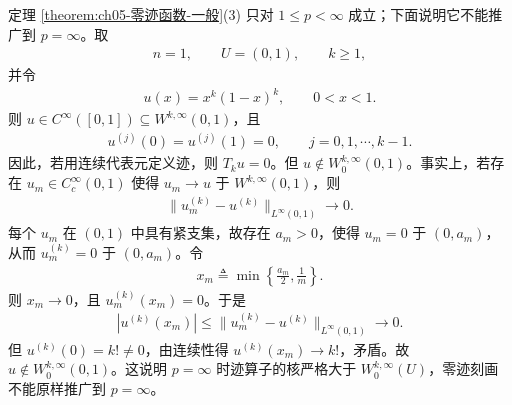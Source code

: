 \documentclass[../../main.tex]{subfiles}%
\begin{document}
\begin{remark}[$p=\infty$ 时零迹刻画失效]\label{remark:ch05-pinfty零迹反例}
定理 \ref{theorem:ch05-零迹函数-一般}(3) 只对 $1\leqslant p<\infty$ 成立；下面说明它不能推广到 $p=\infty$。取
\begin{align*}
n=1,
\qquad
U=(0,1),
\qquad
k\geqslant1,
\end{align*}
并令
\begin{align*}
u(x)=x^{k}(1-x)^{k},
\qquad 0<x<1.
\end{align*}
则 $u\in C^{\infty}([0,1])\subseteq W^{k,\infty}(0,1)$，且
\begin{align*}
u^{(j)}(0)=u^{(j)}(1)=0,
\qquad j=0,1,\cdots,k-1.
\end{align*}
因此，若用连续代表元定义迹，则 $T_{k}u=0$。但 $u\notin W^{k,\infty}_{0}(0,1)$。事实上，若存在 $u_{m}\in C^{\infty}_{c}(0,1)$ 使得 $u_{m}\to u$ 于 $W^{k,\infty}(0,1)$，则
\begin{align*}
\|u_{m}^{(k)}-u^{(k)}\|_{L^{\infty}(0,1)}
\longrightarrow0.
\end{align*}
每个 $u_{m}$ 在 $(0,1)$ 中具有紧支集，故存在 $a_{m}>0$，使得 $u_{m}=0$ 于 $(0,a_{m})$，从而 $u_{m}^{(k)}=0$ 于 $(0,a_{m})$。令
\begin{align*}
x_{m}\triangleq\min\left\{\frac{a_{m}}{2},\frac{1}{m}\right\}.
\end{align*}
则 $x_{m}\to0$，且 $u_{m}^{(k)}(x_{m})=0$。于是
\begin{align*}
|u^{(k)}(x_{m})|
\leqslant
\|u_{m}^{(k)}-u^{(k)}\|_{L^{\infty}(0,1)}
\longrightarrow0.
\end{align*}
但 $u^{(k)}(0)=k!\neq0$，由连续性得 $u^{(k)}(x_{m})\to k!$，矛盾。故 $u\notin W^{k,\infty}_{0}(0,1)$。这说明 $p=\infty$ 时迹算子的核严格大于 $W^{k,\infty}_{0}(U)$，零迹刻画不能原样推广到 $p=\infty$。
\end{remark}
\end{document}
